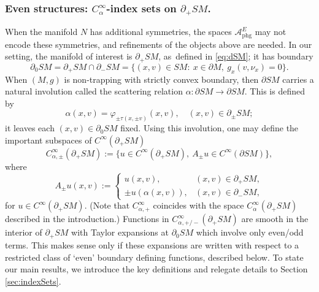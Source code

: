 \documentclass[JEP,XML,SOM,Unicode,NoFloatCountersInSection, NoEqCountersInSection,published]{cedram}
\theoremstyle{plain}
\theoremstyle{definition}
\theoremstyle{remark}
\def\A{\mathcal{A}}
\newcommand{\phg}{\mathrm{phg}}
\begin{document}
\subsubsection*{Even structures: $C_\alpha^\infty$-index sets on $\partial_+ SM$.} When the manifold $N$ has additional symmetries, the spaces $\A_{\phg}^E$
may not encode these symmetries, and refinements of the objects above are needed. In our setting, the manifold of interest is $\partial_+ SM$,
as~defined in \eqref{eq:dSM}; it has boundary
\begin{equation*}
\partial_0 SM = \partial_+ SM\cap \partial_- SM = \{(x,v)\in SM:\ x\in \partial M,\ g_x(v,\nu_x) = 0\}.
\end{equation*}
When $(M,g)$ is non-trapping with strictly convex boundary, then $\partial SM$ carries a natural involution called the scattering relation
$\alpha\colon \partial SM\to \partial SM$. This is defined by
\begin{equation*}
\alpha(x,v) = \varphi_{\pm \tau(x,\pm v)} (x,v), \quad (x,v) \in \partial_\pm SM;
\end{equation*}
it leaves each $(x,v)\in \partial_0 SM$ fixed. Using this involution, one may define the important subspaces of $C^\infty(\partial_+ SM)$
\begin{equation}
C_{\alpha,\pm}^\infty (\partial_+ SM) := \{u\in C^\infty(\partial_+ SM),\ A_\pm u \in C^\infty(\partial SM)\},
\label{eq:Cpm}
\end{equation}
where
\begin{equation*}
A_\pm u(x,v) := 
\begin{cases}
u(x,v), & (x,v)\in \partial_+ SM, \\
\pm u(\alpha(x,v)), & (x,v)\in \partial_- SM,
\end{cases}
\end{equation*}
for $u\in C^\infty(\partial_+ SM)$.
(Note that $C_{\alpha,+}^\infty$ coincides with the space $C_\alpha^\infty(\partial_+ SM)$ described in the introduction.)
Functions in $C_{\alpha,+/-}^\infty (\partial_+ SM)$ are smooth in the interior of $\partial_+ SM$ with Taylor expansions at $\partial_0 SM$ which
involve only even/odd terms. This makes sense only if these expansions are written with respect to a restricted class of `even' boundary defining functions,
described below. To state our main results, we introduce the key definitions and relegate details to Section \ref{sec:indexSets}.
\end{document}

